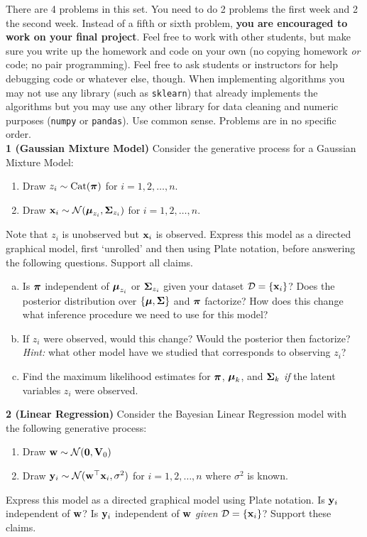 \documentclass[12pt,letterpaper,fleqn]{hmcpset}
\begin{document}
There are 4 problems in this set. You need to do 2 problems the first week and 2 the second
week. Instead of a fifth or sixth problem, \textbf{you are encouraged to work on your final project}.
Feel free to work with other students, but make sure you write up the homework
and code on your own (no copying homework \textit{or} code; no pair programming).
Feel free to ask students or instructors for help debugging code or whatever else,
though.
When implementing algorithms you may not use any library (such as \texttt{sklearn})
that already implements the algorithms but you may use any other library for
data cleaning and numeric purposes (\texttt{numpy} or \texttt{pandas}). Use common
sense. Problems are in no specific order.\\[1em]

\textbf{1 (Gaussian Mixture Model)} Consider the generative process for a Gaussian
Mixture Model:
\begin{enumerate}[(1)]
    \item Draw $z_i \sim \mathrm{Cat}(\hbox{\boldmath$\pi$})$ for $i=1,2,\dots,n$.
    \item Draw ${\bf x}_i \sim {\cal N}(\hbox{\boldmath$\mu$}_{z_i}, \hbox{\boldmath$\Sigma$}_{z_i})$ for $i=1,2,\dots,n$.
\end{enumerate}
Note that $z_i$ is unobserved but ${\bf x}_i$ is observed.
Express this model as a directed graphical model, first `unrolled' and then using
Plate notation, before answering the following questions. Support all claims.
\begin{enumerate}[(a)]
    \item Is $\hbox{\boldmath$\pi$}$ independent of $\hbox{\boldmath$\mu$}_{z_i}$ or $\hbox{\boldmath$\Sigma$}_{z_i}$ given
        your dataset ${\cal D} = \{{\bf x}_i\}$? Does the posterior distribution over
        $\{\hbox{\boldmath$\mu$},\hbox{\boldmath$\Sigma$}\}$ and $\hbox{\boldmath$\pi$}$ factorize? How does this change what inference
        procedure we need to use for this model?
    \item If $z_i$ were observed, would this change? Would the posterior then
        factorize? \textit{Hint:} what other model have we studied that corresponds to
        observing $z_i$?
    \item Find the maximum likelihood estimates for $\hbox{\boldmath$\pi$}$, $\hbox{\boldmath$\mu$}_k$, and $\hbox{\boldmath$\Sigma$}_k$
        \textit{if} the latent variables $z_i$ were observed.\\
\end{enumerate}

\textbf{2 (Linear Regression)} Consider the Bayesian Linear Regression model with
the following generative process:
\begin{enumerate}[(1)]
    \item Draw ${\bf w} \sim {\cal N}({\bf 0}, \mathbf{V}_0)$
    \item Draw ${\bf y}_i \sim {\cal N}({\bf w}^\top{\bf x}_i, \sigma^2)$ for $i=1,2,\dots,n$ where $\sigma^2$
        is known.
\end{enumerate}
Express this model as a directed graphical model using Plate notation. Is ${\bf y}_i$
independent of ${\bf w}$? Is ${\bf y}_i$ independent of ${\bf w}$ \textit{given} ${\cal D} = \{{\bf x}_i\}$? Support
these claims.\newpage
\end{document}
